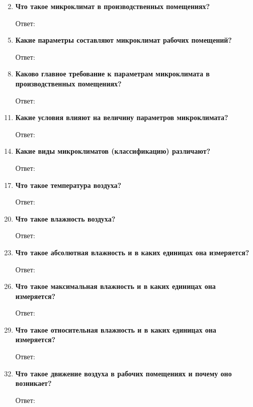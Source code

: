 \documentclass[a5paper, 12dd, twoside]{article}
\begin{document}
\begin{enumerate}
    \item []
    \item {\bfseries Что такое микроклимат в производственных помещениях?}
    \item [Ответ:]
    \item []
    \item {\bfseries Какие параметры составляют микроклимат рабочих помещений?}
    \item [Ответ:]
    \item []
    \item {\bfseries Каково главное требование к параметрам микроклимата в производственных помещениях?}
    \item [Ответ:]
    \item []
    \item {\bfseries Какие условия влияют на величину параметров микроклимата?}
    \item [Ответ:]
    \item []
    \item {\bfseries Какие виды микроклиматов (классификацию) различают?}
    \item [Ответ:]
    \item []
    \item {\bfseries Что такое температура воздуха?}
    \item [Ответ:]
    \item []
    \item {\bfseries Что такое влажность воздуха?}
    \item [Ответ:]
    \item []
    \item {\bfseries Что такое абсолютная влажность и в каких единицах она измеряется?}
    \item [Ответ:]
    \item []
    \item {\bfseries Что такое максимальная влажность и в каких единицах она измеряется?}
    \item [Ответ:]
    \item []
    \item {\bfseries Что такое относительная влажность и в каких единицах она измеряется?}
    \item [Ответ:]
    \item []
    \item {\bfseries Что такое движение воздуха в рабочих помещениях и почему оно возникает?}
    \item [Ответ:]
    \item []

\end{enumerate}
\end{document}
